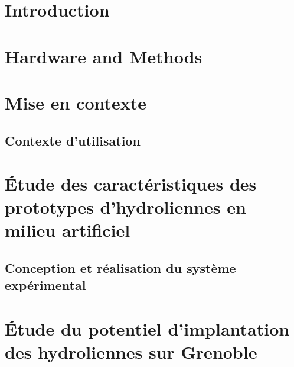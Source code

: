 \documentclass[11pt]{report}
\begin{document}




	\listoffigures

    \listoftables

\chapter{Introduction}
    

\chapter{Hardware and Methods}
    


\chapter{Mise en contexte}

    \section{Contexte d'utilisation}


\chapter[Étude d'hydroliennes en milieu artificiel]{Étude des caractéristiques des prototypes d'hydroliennes en milieu artificiel}

    \section{Conception et réalisation du système expérimental}

\chapter[Implantation des hydroliennes sur Grenoble]{Étude du potentiel d'implantation des hydroliennes sur Grenoble}
\end{document}
